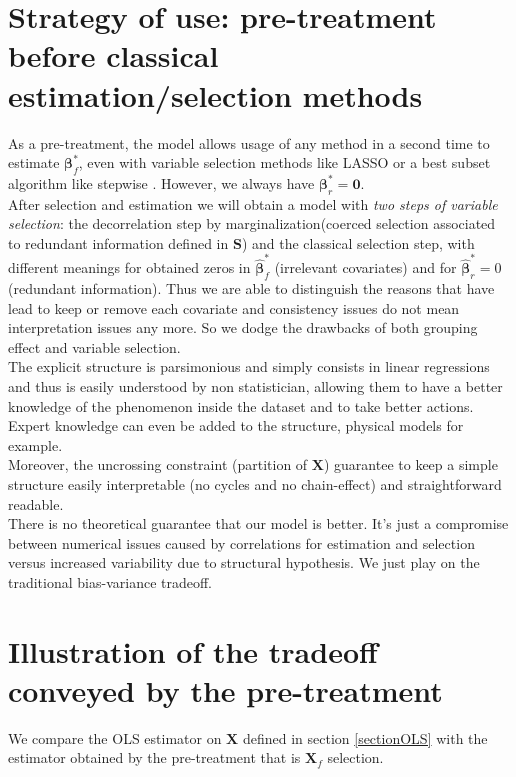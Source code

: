 \documentclass[12pt,a4paper]{report}
\begin{document}
\section{Strategy of use: pre-treatment before classical estimation/selection methods}\label{interpretation}

As a pre-treatment, the model allows usage of any method in a second time to estimate $\boldsymbol{\beta}_{f}^*$, even with variable selection methods like LASSO or a best subset algorithm like stepwise \cite{seber2012linear}. However, we always have $\boldsymbol{\beta}^*_r=\boldsymbol{0}$.\\

After selection and estimation we will obtain a model with { \it two steps of variable selection}: the decorrelation step by marginalization(coerced selection associated to redundant information defined in $\boldsymbol{S}$) and the classical selection step, with different meanings for obtained zeros in $\hat{\boldsymbol{\beta}}^*_{f}$ (irrelevant covariates) and for $\hat{\boldsymbol{\beta}}^*_{r}=0$ (redundant information). 
 Thus we are able to distinguish the reasons that have lead to keep or remove each covariate and consistency issues do not mean interpretation issues any more. So we dodge the drawbacks of both grouping effect and variable selection.\\


The explicit structure is parsimonious and simply consists in linear regressions and thus is easily understood by non statistician, allowing them to have a better knowledge of the phenomenon inside the dataset and to take better actions. Expert knowledge can even be added to the structure, physical models for example.\\

Moreover, the uncrossing constraint (partition of $\boldsymbol{X}$) guarantee to keep a simple structure easily interpretable (no cycles and no chain-effect) and straightforward readable.\\
	
			There is no theoretical guarantee that our model is better. It's just a compromise between numerical issues caused by correlations for estimation and selection versus increased variability due to structural hypothesis. We just play on the traditional bias-variance tradeoff. 
			


	
	\section{Illustration of the tradeoff conveyed by the pre-treatment}	
	We compare the OLS estimator on $\boldsymbol{X}$ defined in section \ref{sectionOLS} with the estimator obtained by the pre-treatment that is $\boldsymbol{X}_f$ selection.
  
\end{document}
